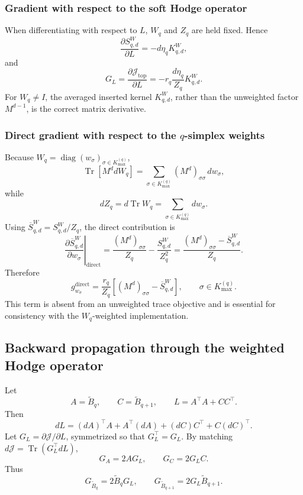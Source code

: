 \documentclass[pdflatex,sn-mathphys-num]{sn-jnl}%
\theoremstyle{thmstyleone}%
\theoremstyle{thmstyletwo}%
\theoremstyle{thmstylethree}%
\begin{document}
\begin{appendices}
\subsubsection{Gradient with respect to the soft Hodge operator}

When differentiating with respect to \(L\), \(W_q\) and \(Z_q\) are held fixed. Hence
\[
\frac{\partial S_{q,d}^{W}}{\partial L}
=
-d\eta_qK_{q,d}^{W},
\]
and
\[
G_L
=
\frac{\partial\mathcal J_{\mathrm{top}}}{\partial L}
=
-r_q
\frac{d\eta_q}{Z_q}
K_{q,d}^{W}.
\]
For \(W_q\neq I\), the averaged inserted kernel \(K_{q,d}^{W}\), rather than the unweighted factor \(M^{d-1}\), is the correct matrix derivative.

\subsubsection{Direct gradient with respect to the \(q\)-simplex weights}

Because
\(W_q=\operatorname{diag}(w_\sigma)_{\sigma\in K_{\max}^{(q)}}\),
\[
\operatorname{Tr}[M^d dW_q]
=
\sum_{\sigma\in K_{\max}^{(q)}}
(M^d)_{\sigma\sigma}\,dw_\sigma,
\]
while
\[
dZ_q
=
d\operatorname{Tr}W_q
=
\sum_{\sigma\in K_{\max}^{(q)}}dw_\sigma.
\]
Using
\(\overline S_{q,d}^{W}=S_{q,d}^{W}/Z_q\),
the direct contribution is
\[
\left.
\frac{\partial\overline S_{q,d}^{W}}
{\partial w_\sigma}
\right|_{\mathrm{direct}}
=
\frac{(M^d)_{\sigma\sigma}}{Z_q}
-
\frac{S_{q,d}^{W}}{Z_q^2}
=
\frac{
(M^d)_{\sigma\sigma}
-
\overline S_{q,d}^{W}
}{Z_q}.
\]
Therefore
\[
g_{w_\sigma}^{\mathrm{direct}}
=
\frac{r_q}{Z_q}
\left[
(M^d)_{\sigma\sigma}
-
\overline S_{q,d}^{W}
\right],
\qquad
\sigma\in K_{\max}^{(q)}.
\]
This term is absent from an unweighted trace objective and is essential for consistency with the \(W_q\)-weighted implementation.

\subsection{Backward propagation through the weighted Hodge operator}

Let
\[
A=\widetilde B_q,
\qquad
C=\widetilde B_{q+1},
\qquad
L=A^\top A+CC^\top.
\]
Then
\[
dL
=
(dA)^\top A
+
A^\top(dA)
+
(dC)C^\top
+
C(dC)^\top.
\]
Let \(G_L=\partial\mathcal J/\partial L\), symmetrized so that \(G_L^\top=G_L\). By matching
\(d\mathcal J=\operatorname{Tr}(G_L^\top dL)\),
\[
G_A=2AG_L,
\qquad
G_C=2G_LC.
\]
Thus
\[
G_{\widetilde B_q}
=
2\widetilde B_qG_L,
\qquad
G_{\widetilde B_{q+1}}
=
2G_L\widetilde B_{q+1}.
\]


\end{appendices}
\end{document}
